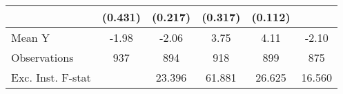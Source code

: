 {\begin{tabular}{l*{5}{c}}
            &     (0.431)         &     (0.217)         &     (0.317)         &     (0.112)         &                     \\
\midrule
Mean Y      &       -1.98         &       -2.06         &        3.75         &        4.11         &       -2.10         \\
Observations&         937         &         894         &         918         &         899         &         875         \\
Exc. Inst. F-stat&                     &      23.396         &      61.881         &      26.625         &      16.560         \\
\bottomrule
\end{tabular}
}
